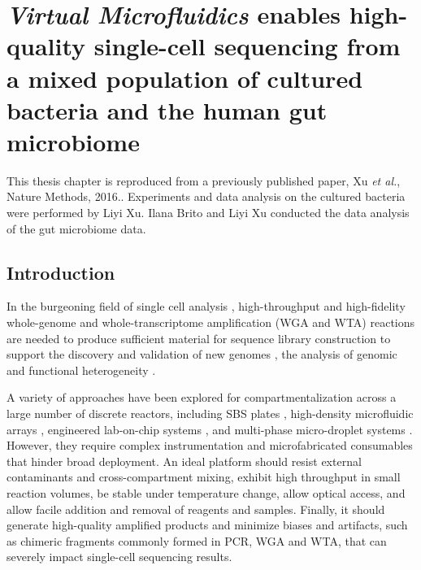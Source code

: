 \chapter{\textbf{\textit{Virtual Microfluidics}} enables high-quality single-cell sequencing from a mixed population of cultured bacteria and the human gut microbiome}

This thesis chapter is reproduced from a previously published paper, Xu \textit{et al.}, Nature Methods, 2016.\cite{Xu:2016wt}. Experiments and data analysis on the cultured bacteria were performed by Liyi Xu. Ilana Brito and Liyi Xu conducted the data analysis of the gut microbiome data.


\section{Introduction}
In the burgeoning field of single cell analysis \cite{Blainey:2013hn}, high-throughput and high-fidelity whole-genome \cite{Raghunathan:2005fg,Zhang:2006hq,Fu:2015gl} and whole-transcriptome amplification (WGA and WTA) reactions are needed to produce sufficient material for sequence library construction to support the discovery and validation of new genomes \cite{Marshall:2012jz,Pamp:2012cj,Hess:2011gu}, the analysis of genomic and functional heterogeneity \cite{Wang:2012bb,Fu:2015gl,Pamp:2012cj}.

A variety of approaches have been explored for compartmentalization across a large number of discrete reactors, including SBS plates \cite{Zhang:2006hq}, high-density microfluidic arrays \cite{Love:2013hf}, engineered lab-on-chip systems \cite{Thorsen:2002dn,Landry:2013dh,deBourcy:2014ji,Marcy:2007ip}, and multi-phase micro-droplet systems \cite{Fu:2015gl,Thorsen:2001td,Hindson:2011fg,Morinishi:2015jx}. However, they require complex instrumentation and microfabricated consumables that hinder broad deployment. An ideal platform should resist external contaminants and cross-compartment mixing, exhibit high throughput in small reaction volumes, be stable under temperature change, allow optical access, and allow facile addition and removal of reagents and samples. Finally, it should generate high-quality amplified products and minimize biases and artifacts, such as chimeric fragments commonly formed in PCR, WGA and WTA, that can severely impact single-cell sequencing results. 

